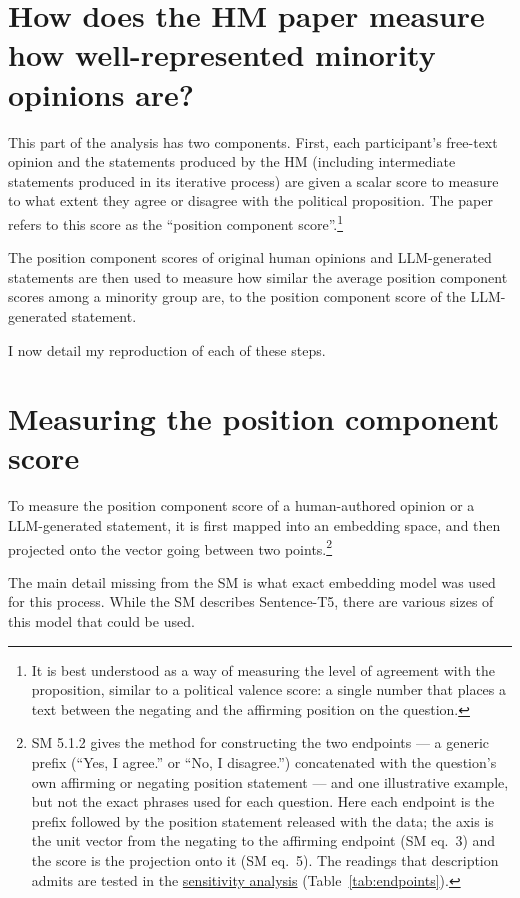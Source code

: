 \documentclass[11pt,a4paper]{article}
\begin{document}
\section*{How does the HM paper measure how well-represented minority opinions are?}

This part of the analysis has two components. First, each participant's free-text opinion and the
statements produced by the HM (including intermediate statements produced in its iterative process)
are given a scalar score to measure to what extent they agree or disagree with the political
proposition. The paper refers to this score as the ``position component score''.\footnote{It
is best understood as a way of measuring the level of agreement with the proposition,
similar to a political valence score: a single number that places a text between the negating and
the affirming position on the question.}

The position component scores of original human opinions and LLM-generated statements are then
used to measure how similar the average position component scores among a minority group are, to
the position component score of the LLM-generated statement.

I now detail my reproduction of each of these steps.

\section*{Measuring the position component score}

To measure the position component score of a human-authored opinion or a LLM-generated statement,
it is first mapped into an embedding space, and then projected onto the vector going between
two points.\footnote{SM 5.1.2 gives the method for constructing the two endpoints --- a
generic prefix (``Yes, I agree.'' or ``No, I disagree.'') concatenated with the question's own
affirming or negating position statement --- and one illustrative example, but not the exact
phrases used for each question. Here each endpoint is the prefix followed by the position statement
released with the data; the axis is the unit vector from the negating to the affirming endpoint (SM
eq.~3) and the score is the projection onto it (SM eq.~5). The readings that description admits are
tested in the \hyperref[sec:endpoints]{sensitivity analysis} (Table~\ref{tab:endpoints}).}

The main detail missing from the SM is what exact embedding model was used for this process. While
the SM describes Sentence-T5, there are various sizes of this model that could be used.
\end{document}
